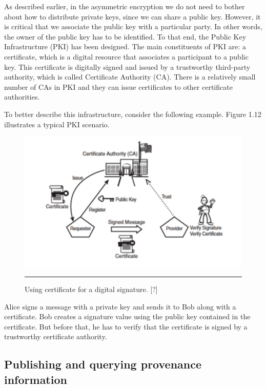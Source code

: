 As described earlier, in the asymmetric encryption we do not need to bother about how to distribute private keys, since we can share a public key. However, it is critical that we associate the public key with a particular party. In other words, the owner of the public key has to be identified. To that end, the Public Key Infrastructure (PKI) has been designed. The main constituents of PKI are: a certificate, which is a digital resource that associates a participant to a public key. This certificate is digitally signed and issued by a trustworthy third-party authority, which is called Certificate Authority (CA). There is a relatively small number of CAs in PKI and they can issue certificates to other certificate authorities.

To better describe this infrastructure, consider the following example. Figure 1.12 illustrates a typical PKI scenario.

\begin{figure}[htbp]
	\centering
		\includegraphics{./Figures/figure15.pdf}
		\rule{35em}{0.5pt}
	\caption[Public Key Infrastructure]{Using certificate for a digital signature. [?]}
	\label{fig:pki}
\end{figure}

Alice signs a message with a private key and sends it to Bob along with a certificate.  Bob creates a signature value using the public key contained in the certificate. But before that, he has to verify that the certificate is signed by a trustworthy certificate authority.

\subsection{Publishing and querying provenance information}

